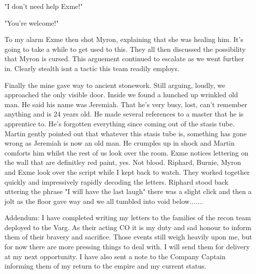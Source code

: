 "I don't need help Exme!"\medskip

"You're welcome!"\medskip

To my alarm Exme then shot Myron, explaining that she was healing him. It's going to take a while to get used to this. They all then discussed the possibility that Myron is cursed. This arguement continued to escalate as we went further in. Clearly stealth isnt a tactic this team readily employs.\medskip

Finally the mine gave way to ancient stonework. Still arguing, loudly, we approached the only visible door. Inside we found a hunched up wrinkled old man. He said his name was Jeremiah. That he's very busy, lost, can't remember anything and is 24 years old. He made several references to a master that he is apprentice to. He's forgotten everything since coming out of the stasis tube. Martin gently pointed out that whatever this stasis tube is, something has gone wrong as Jeremiah is now an old man. He crumples up in shock and Martin comforts him whilst the rest of us look over the room. Exme notices lettering on the wall that are definitley red paint, yes. Not blood. Riphard, Burnie, Myron and Exme look over the script while I kept back to watch. They worked together quickly and impressively rapidly decoding the letters. Riphard stood back uttering the phrase "I will have the last laugh" there was a slight click and then a jolt as the floor gave way and we all tumbled into void below.......\medskip

Addendum: I have completed writing my letters to the families of the recon team deployed to the Varg. As their acting CO it is my duty and sad honour to inform them of their bravery and sacrifice. Those events still weigh heavily upon me, but for now there are more pressing things to deal with. I will send them for delivery at my next opportunity. I have also sent a note to the Company Captain informing them of my return to the empire and my current status.\medskip

\vspace*{5mm}
